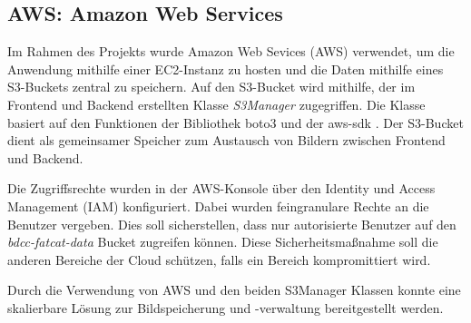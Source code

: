 \subsection{AWS: Amazon Web Services}
Im Rahmen des Projekts wurde Amazon Web Sevices (AWS) verwendet, um die Anwendung mithilfe einer EC2-Instanz zu hosten und die Daten mithilfe eines S3-Buckets zentral zu speichern. Auf den
S3-Bucket wird mithilfe, der im Frontend und Backend erstellten Klasse \textit{S3Manager} zugegriffen. Die Klasse basiert auf den Funktionen der Bibliothek boto3 \cite{boto3} und der aws-sdk \cite{awsSdk}. Der S3-Bucket dient als gemeinsamer Speicher zum Austausch von Bildern zwischen Frontend und Backend. 

Die Zugriffsrechte wurden in der AWS-Konsole über den Identity und Access Management (IAM) konfiguriert. Dabei wurden feingranulare Rechte an die Benutzer 
vergeben. Dies soll sicherstellen, dass nur autorisierte Benutzer auf den \textit{bdcc-fatcat-data} Bucket zugreifen können. Diese Sicherheitsmaßnahme soll die anderen Bereiche der Cloud schützen, falls ein Bereich kompromittiert wird.

Durch die Verwendung von AWS und den beiden S3Manager Klassen konnte eine skalierbare Lösung zur Bildspeicherung und -verwaltung bereitgestellt werden.
